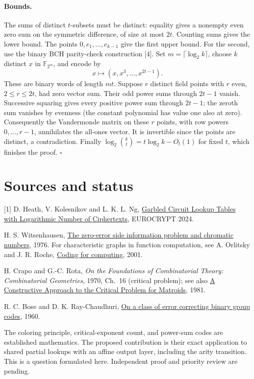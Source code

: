 \documentclass[11pt]{article}
\begin{document}
\paragraph{Bounds.}
The sums of distinct $t$-subsets must be distinct: equality gives a nonempty even zero sum on the symmetric difference, of size at most $2t$. Counting sums gives the lower bound. The points $0,e_1,\ldots,e_{k-1}$ give the first upper bound. For the second, use the binary BCH parity-check construction [4]. Set $m=\lceil\log_2 k\rceil$, choose $k$ distinct $x$ in $\mathbb F_{2^m}$, and encode by
\[
                     x\longmapsto (x,x^3,\ldots,x^{2t-1}).
\]
These are binary words of length $mt$. Suppose $r$ distinct field points with $r$ even, $2\le r\le2t$, had zero vector sum. Their odd power sums through $2t-1$ vanish. Successive squaring gives every positive power sum through $2t-1$; the zeroth sum vanishes by evenness (the constant polynomial has value one also at zero). Consequently the Vandermonde matrix on these $r$ points, with row powers $0,\ldots,r-1$, annihilates the all-ones vector. It is invertible since the points are distinct, a contradiction. Finally $\log_2\binom kt=t\log_2 k-O_t(1)$ for fixed $t$, which finishes the proof. \hfill$\square$

\section*{Sources and status}
[1] D. Heath, V. Kolesnikov and L. K. L. Ng, \href{https://eprint.iacr.org/2024/369}{Garbled Circuit Lookup Tables with Logarithmic Number of Ciphertexts}, EUROCRYPT 2024.\par
[2] H. S. Witsenhausen, \href{https://doi.org/10.1109/TIT.1976.1055607}{The zero-error side information problem and chromatic numbers}, 1976. For characteristic graphs in function computation, see A. Orlitsky and J. R. Roche, \href{https://doi.org/10.1109/18.915643}{Coding for computing}, 2001.\par
[3] H. Crapo and G.-C. Rota, \emph{On the Foundations of Combinatorial Theory: Combinatorial Geometries}, 1970, Ch.~16 (critical problem); see also \href{https://www.sciencedirect.com/science/article/pii/S0195669881800054}{A Constructive Approach to the Critical Problem for Matroids}, 1981.\par
[4] R. C. Bose and D. K. Ray-Chaudhuri, \href{https://www.sciencedirect.com/science/article/pii/S0019995860902874}{On a class of error correcting binary group codes}, 1960.
\par\medskip
The coloring principle, critical-exponent count, and power-sum codes are established mathematics. The proposed contribution is their exact application to shared partial lookups with an affine output layer, including the arity transition. This is a question formulated here. Independent proof and priority review are pending.
\end{document}
